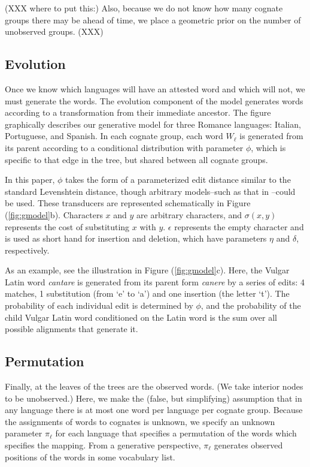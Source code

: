\documentclass[11pt,a4paper]{article}
\begin{document}
(XXX where to put this:) Also, because we do not know how many
cognate groups there may be ahead of time, we place a geometric
prior on the number of unobserved groups. (XXX)

\subsection{Evolution}

Once we know which languages will have an attested word and which
will not, we must generate the words. The evolution component of
the model generates words according to a transformation from their
immediate ancestor. The figure graphically describes our generative
model for three Romance languages: Italian, Portuguese, and Spanish.
In each cognate group, each word $W_\ell$ is generated from its
parent according to a conditional distribution with parameter $\phi$,
which is specific to that edge in the tree, but shared between all
cognate groups.

In this paper, $\phi$ takes the form of a parameterized edit distance
similar to the standard Levenshtein distance, though arbitrary
models--such as that in --could
be used. These transducers are represented schematically in Figure
(\ref{fig:gmodel}b). Characters $x$ and $y$ are arbitrary characters,
and $\sigma(x,y)$ represents the cost of substituting $x$ with $y$.
$\epsilon$ represents the empty character and is used as short hand
for insertion and deletion, which have parameters $\eta$ and $\delta$,
respectively.

As an example, see the illustration in Figure (\ref{fig:gmodel}c).
Here, the Vulgar Latin word \textit{cantare} is generated from its
parent form \textit{canere} by a series of edits: 4 matches, 1
substitution (from `e' to `a') and one insertion (the letter `t').
The probability of each individual edit is determined by $\phi$,
and the probability of the child Vulgar Latin word conditioned on
the Latin word is the sum over all possible alignments that generate
it.

\subsection{Permutation}

Finally, at the leaves of the trees are the observed words. (We
take interior nodes to be unobserved.) Here, we make the (false,
but simplifying) assumption that in any language there is at most
one word per language per cognate group. Because the assignments
of words to cognates is unknown, we specify an unknown parameter
$\pi_\ell$ for each language that specifies a permutation of the
words which specifies the mapping. From a generative perspective,
$\pi_\ell$ generates observed positions of the words in some
vocabulary list.
\end{document}

